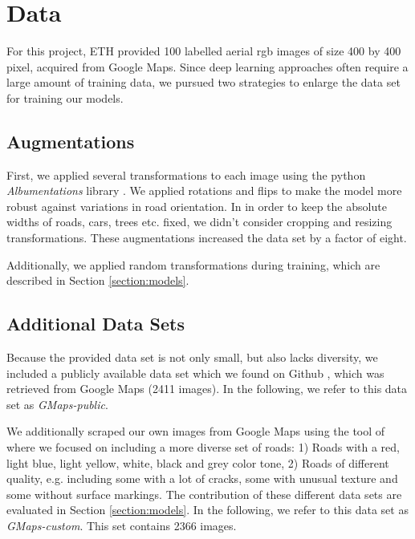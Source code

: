 \section{Data}  \label{section:data}
For this project, ETH provided 100 labelled aerial \acrshort{rgb} images of size 400 by 400 pixel, acquired from Google Maps. Since deep learning approaches often require a large amount of training data, we pursued two strategies to enlarge the data set for training our models.

\subsection{Augmentations}

First, we applied several transformations to each image using the python \textit{Albumentations} library \cite{albumentations}. We applied rotations and flips to make the model more robust against variations in road orientation. In in order to keep the absolute widths of roads, cars, trees etc. fixed, we didn't consider cropping and resizing transformations. These augmentations increased the data set by a factor of eight.

Additionally, we applied random transformations during training, which are described in Section \ref{section:models}.


\subsection{Additional Data Sets}

Because the provided data set is not only small, but also lacks diversity, we included a publicly available data set which we found on Github \cite{jkfrie}, which was retrieved from Google Maps (2411 images). In the following, we refer to this data set as \textit{GMaps-public}.

We additionally scraped our own images from Google Maps using the tool of \cite{jkfrie} where we focused on including a more diverse set of roads: 1) Roads with a red, light blue, light yellow, white, black and grey color tone, 2) Roads of different quality, e.g. including  some with a lot of cracks, some with unusual texture and some without surface markings. The contribution of these different data sets are evaluated in Section \ref{section:models}. In the following, we refer to this data set as \textit{GMaps-custom}. This set contains 2366 images.

